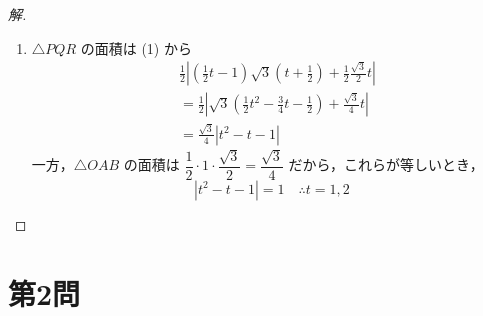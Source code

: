\documentclass[../main.tex]{subfiles}
\begin{document}
\begin{proof}[解]
\begin{enumerate}[(1)]
    \item $\triangle PQR$ の面積は (1) から
      \begin{align*}
        &\frac{1}{2} \left| \left(\frac{1}{2}t-1\right)\sqrt{3}\left(t+\frac{1}{2}\right) + \frac{1}{2}\frac{\sqrt{3}}{2}t \right| \\
        &= \frac{1}{2} \left| \sqrt{3}\left(\frac{1}{2}t^2 - \frac{3}{4}t - \frac{1}{2}\right) + \frac{\sqrt{3}}{4}t \right| \\
        &= \frac{\sqrt{3}}{4} |t^2 - t - 1|
      \end{align*}
      一方，$\triangle OAB$ の面積は $\dfrac{1}{2} \cdot 1 \cdot \dfrac{\sqrt{3}}{2} = \dfrac{\sqrt{3}}{4}$ だから，これらが等しいとき，
      \[
        |t^2 - t - 1| = 1 \quad \therefore t = 1, 2
      \]
  \end{enumerate}
\end{proof}

\newpage

\section*{第2問}
\end{document}
